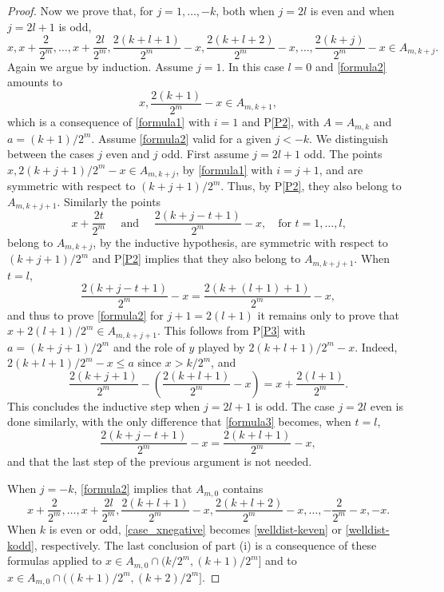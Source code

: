 \documentclass[12pt,reqno]{amsart}
\numberwithin{equation}{section}
\begin{document}
\begin{proof}
Now we prove that, for $j=1,\dots,-k$, both when $j=2l$ is even and when $j=2l+1$ is odd,
\begin{equation}\label{formula2}
 x, x+\frac{2}{2^m},\dots,x+\frac{2l}{2^m},
 \frac{2(k+l+1)}{2^m}-x, \frac{2(k+l+2)}{2^m}-x,\dots, \frac{2(k+j)}{2^m}-x \in A_{m,k+j}.
\end{equation}
Again we argue by induction. Assume $j=1$. In this case $l=0$ and \eqref{formula2} amounts to
\[
  x, \frac{2(k+1)}{2^m}-x \in A_{m,k+1},
\]
which is a consequence of \eqref{formula1} with $i=1$ and P\ref{P2}, with $A=A_{m,k}$ and $a={(k+1)/2^m}$.
Assume \eqref{formula2} valid for a given $j<-k$. We distinguish between the cases $j$ even and $j$ odd. First assume  $j=2l+1$ odd. The points $x,2(k+j+1)/2^m-x\in A_{m,k+j}$, by \eqref{formula1} with $i=j+1$, and are symmetric with respect to $(k+j+1)/2^m$. Thus, by P\ref{P2}, they also belong to $A_{m,k+j+1}$. Similarly the points
\[
 x+\frac{2t}{2^m}\quad\text{ and } \quad \frac{2(k+j-t+1)}{2^m}-x, \quad\text{for $t=1,\dots,l$,}
\]
belong to $A_{m,k+j}$, by the inductive hypothesis, are symmetric with respect to $(k+j+1)/2^m$ and P\ref{P2} implies that they also belong to $A_{m,k+j+1}$. When $t=l$,
\begin{equation}\label{formula3}
\frac{2(k+j-t+1)}{2^m}-x= \frac{2(k+(l+1)+1)}{2^m}-x,
\end{equation}
and thus to prove \eqref{formula2} for $j+1=2(l+1)$ it remains only to prove that $x+2(l+1)/{2^m}\in A_{m,k+j+1}$. This follows from P\ref{P3} with  $a=(k+j+1)/2^m$ and the role of $y$ played by  $2(k+l+1)/2^m-x$. Indeed, $2(k+l+1)/2^m-x\leq a$ since $x>k/2^m$, and
\[
 \frac{2(k+j+1)}{2^m}-\left(\frac{2(k+l+1)}{2^m}-x\right)=x+\frac{2(l+1)}{2^m}.
\]
This concludes the inductive step when $j=2l+1$ is odd. The case $j=2l$ even is done similarly, with the only difference that \eqref{formula3} becomes, when $t=l$,
\[
 \frac{2(k+j-t+1)}{2^m}-x= \frac{2(k+l+1)}{2^m}-x,
\]
and that the last step of the previous argument is not needed.

When $j=-k$, \eqref{formula2} implies that  $A_{m,0}$ contains
\begin{equation}\label{case_xnegative}
x+\frac{2}{2^m},\dots, x+\frac{2l}{2^m}, \frac{2(k+l+1)}{2^m}-x, \frac{2(k+l+2)}{2^m}-x, \dots, -\frac{2}{2^m}-x, -x.
\end{equation}
When $k$ is even or odd,  \eqref{case_xnegative} becomes \eqref{welldist-keven} or \eqref{welldist-kodd}, respectively. The last conclusion of part (i) is a consequence of these formulas applied to $x\in A_{m,0}\cap(k/2^m, (k+1)/2^m]$ and to $x\in A_{m,0}\cap((k+1)/2^m, (k+2)/2^m]$.


\end{proof}
\end{document}
